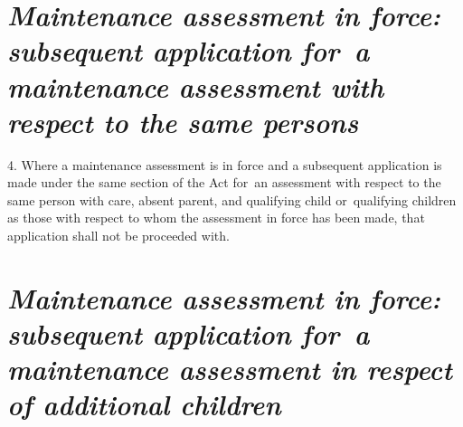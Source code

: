\documentclass[a4paper,12pt]{article}
\begin{document}

\section*{\itshape Maintenance assessment in force: subsequent application for~a maintenance assessment with respect to the same persons}

4.  Where a maintenance assessment is in force and a subsequent application is made under the same section of the Act for~an assessment with respect to the same person with care, absent parent, and qualifying child or~qualifying children as those with respect to whom the assessment in force has been made, that application shall not be proceeded with. 


%

\section*{\itshape Maintenance assessment in force: subsequent application for~a maintenance assessment in respect of additional children}
\end{document}
